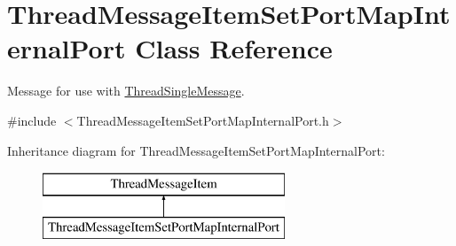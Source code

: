 \hypertarget{class_thread_message_item_set_port_map_internal_port}{
\section{ThreadMessageItemSetPortMapInternalPort Class Reference}
\label{class_thread_message_item_set_port_map_internal_port}
}


Message for use with \hyperlink{class_thread_single_message}{ThreadSingleMessage}.  




{\ttfamily \#include $<$ThreadMessageItemSetPortMapInternalPort.h$>$}

Inheritance diagram for ThreadMessageItemSetPortMapInternalPort:\begin{figure}[H]
\begin{center}
\leavevmode
\includegraphics[height=2.000000cm]{class_thread_message_item_set_port_map_internal_port}
\end{center}
\end{figure}
